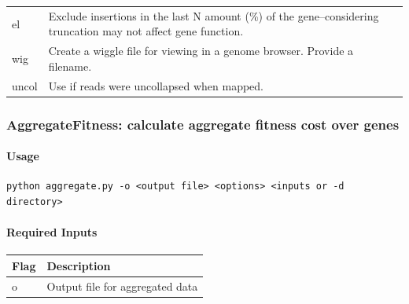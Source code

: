 \documentclass[11pt,]{article}
\let\oldparagraph\paragraph
\renewcommand{\paragraph}[1]{\oldparagraph{#1}\mbox{}}
\begin{document}
\begin{longtable}[]{@{}ll@{}}
\begin{minipage}[t]{0.08\columnwidth}\raggedright\strut
el\strut
\end{minipage} & \begin{minipage}[t]{0.86\columnwidth}\raggedright\strut
Exclude insertions in the last N amount (\%) of the gene--considering
truncation may not affect gene function.\strut
\end{minipage}\tabularnewline
\begin{minipage}[t]{0.08\columnwidth}\raggedright\strut
wig\strut
\end{minipage} & \begin{minipage}[t]{0.86\columnwidth}\raggedright\strut
Create a wiggle file for viewing in a genome browser. Provide a
filename.\strut
\end{minipage}\tabularnewline
\begin{minipage}[t]{0.08\columnwidth}\raggedright\strut
uncol\strut
\end{minipage} & \begin{minipage}[t]{0.86\columnwidth}\raggedright\strut
Use if reads were uncollapsed when mapped.\strut
\end{minipage}\tabularnewline
\bottomrule
\end{longtable}

\subsubsection{AggregateFitness: calculate aggregate fitness cost over
genes}\label{aggregatefitness-calculate-aggregate-fitness-cost-over-genes}

\paragraph{Usage}\label{usage-1}

\begin{verbatim}
python aggregate.py -o <output file> <options> <inputs or -d directory>
\end{verbatim}

\paragraph{Required Inputs}\label{required-inputs-1}

\begin{longtable}[]{@{}ll@{}}
\toprule
Flag & Description\tabularnewline
\midrule
\endhead
o & Output file for aggregated data\tabularnewline
\bottomrule
\end{longtable}
\end{document}
